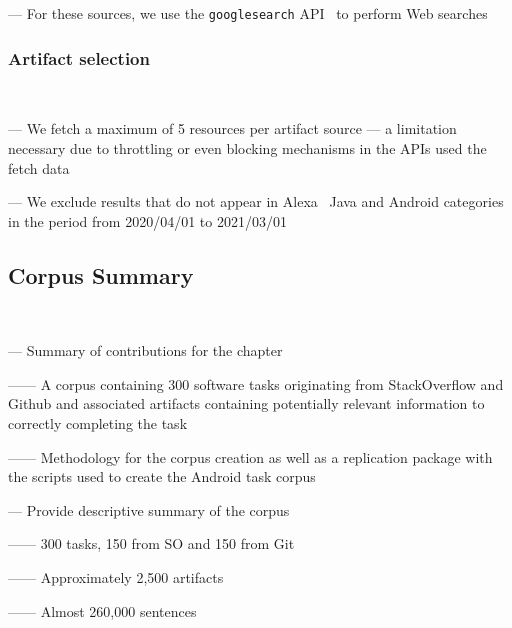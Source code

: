 --- For these sources, we use the \texttt{googlesearch} API~\cite{googlesearch} to perform Web searches


\subsubsection{Artifact selection}
\textcolor{white}{force ident} %

--- We fetch a maximum of 5 resources per artifact source --- a limitation necessary due to throttling or even blocking mechanisms in the APIs used the fetch data \vspace{3mm}

--- We exclude results that do not appear in Alexa~\cite{alexa} Java and Android categories in the period from 2020/04/01
to 2021/03/01





\subsection{Corpus Summary}
\textcolor{white}{force ident} %


--- Summary of contributions for the chapter \vspace{3mm}

------ A corpus containing 300 software tasks originating from StackOverflow and Github and associated artifacts containing potentially relevant information to correctly completing the task \vspace{3mm}

------ Methodology for the corpus creation as well as a replication package with the scripts used to create the Android task corpus \vspace{3mm}


--- Provide descriptive summary of the corpus

------ 300 tasks, 150 from SO and 150 from Git

------ Approximately 2,500 artifacts

------ Almost 260,000 sentences







% 



